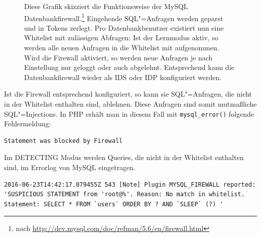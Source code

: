 \begin{figure}[ht]
\begin{margincap}

\caption[db firewall]{Diese Grafik skizziert die Funktionsweise der MySQL Datenbankfirewall.\footnote{\minipagefootnotefix \RaggedRight nach \url{http://dev.mysql.com/doc/refman/5.6/en/firewall.html}} Eingehende SQL"=Anfragen werden geparst und in Tokens zerlegt. Pro Datenbankbenutzer existiert nun eine Whitelist mit zulässigen Abfragen: Ist der Lernmodus aktiv, so werden alle neuen Anfragen in die Whitelist mit aufgenommen. Wird die Firewall aktiviert, so werden neue Anfragen je nach Einstellung nur geloggt oder auch abgelehnt. Entsprechend kann die Datenbankfirewall wieder als IDS oder IDP konfiguriert werden. }
\label{img:db_firewall}
\end{margincap}
\end{figure}


Ist die Firewall entsprechend konfiguriert, so kann sie SQL"=Anfragen, die nicht in der Whitelist enthalten sind, ablehnen. Diese Anfragen sind somit mutmaßliche SQL"=Injections. In PHP erhält man in diesem Fall mit \texttt{mysql_error()} folgende Fehlermeldung:

\begin{listing}[ht!]
\begin{verbatim}
Statement was blocked by Firewall
\end{verbatim}
\end{listing}


Im DETECTING Modus werden Queries, die nicht in der Whitelist enthalten sind, im Errorlog von MySQL eingetragen.
\begin{listing}[ht!]
\begin{verbatim}
2016-06-23T14:42:17.079455Z 543 [Note] Plugin MYSQL_FIREWALL reported: 'SUSPICIOUS STATEMENT from 'root@%'. Reason: No match in whitelist.
Statement: SELECT * FROM `users` ORDER BY ? AND `SLEEP` (?) '
\end{verbatim}
\end{listing}




